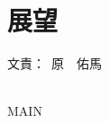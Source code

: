 \documentclass[a4paper]{jarticle}
\newcommand{\resp}[1]{\begin{flushright}文責：~#1\end{flushright}~\\}
\begin{document}
\fi

\section{展望}
  \resp{原　佑馬}

\expandafter\ifx\csname MAIN \endcsname\relax
  
\end{document}
